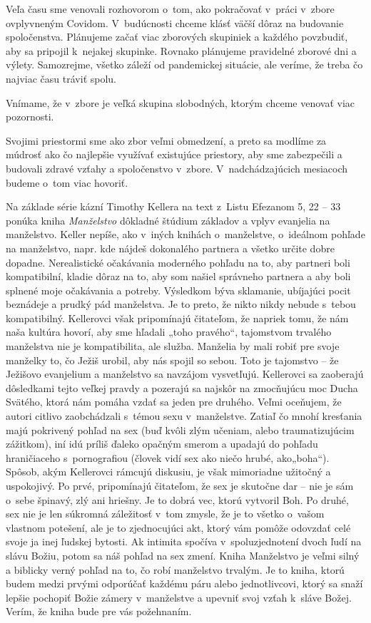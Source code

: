 Veľa času sme venovali rozhovorom o~tom, ako pokračovať v~práci v~zbore ovplyvneným Covidom. V~budúcnosti chceme klásť väčší dôraz na budovanie spoločenstva. Plánujeme začať viac zborových skupiniek a každého povzbudiť, aby sa pripojil k~nejakej skupinke. Rovnako plánujeme pravidelné zborové dni a výlety. Samozrejme, všetko záleží od pandemickej situácie, ale veríme, že treba čo najviac času tráviť spolu.

Vnímame, že v~zbore je veľká skupina slobodných, ktorým chceme venovať viac pozornosti.

Svojimi priestormi sme ako zbor veľmi obmedzení, a preto sa modlíme za múdrosť ako čo najlepšie využívať existujúce priestory, aby sme zabezpečili a budovali zdravé vzťahy a spoločenstvo v~zbore. V~nadchádzajúcich mesiacoch budeme o~tom viac hovoriť.



Na základe série kázní Timothy Kellera na text z~Listu Efezanom 5, 22 -- 33 ponúka kniha {\it Manželstvo} dôkladné štúdium základov a vplyv evanjelia na manželstvo. Keller nepíše, ako v~iných knihách o~manželstve, o~ideálnom pohľade na manželstvo, napr. kde nájdeš dokonalého partnera a všetko určite dobre dopadne. Nerealistické očakávania moderného pohľadu na to, aby partneri boli kompatibilní, kladie dôraz na to, aby som našiel správneho partnera a aby boli splnené moje očakávania a potreby. Výsledkom býva sklamanie, ubíjajúci pocit beznádeje a prudký pád manželstva. Je to preto, že nikto nikdy nebude s~tebou kompatibilný. Kellerovci však pripomínajú čitateľom, že napriek tomu, že nám naša kultúra hovorí, aby sme hľadali „toho pravého“, tajomstvom trvalého manželstva nie je kompatibilita, ale služba. Manželia by mali robiť pre svoje manželky to, čo Ježiš urobil, aby nás spojil so sebou. Toto je tajomstvo -- že Ježišovo evanjelium a manželstvo sa navzájom vysvetľujú. Kellerovci sa zaoberajú dôsledkami tejto veľkej pravdy a pozerajú sa najskôr na zmocňujúcu moc Ducha Svätého, ktorá nám pomáha vzdať sa jeden pre druhého. Veľmi oceňujem, že autori citlivo zaobchádzali s~témou sexu v~manželstve. Zatiaľ čo mnohí kresťania majú pokrivený pohľad na sex (buď kvôli zlým učeniam, alebo traumatizujúcim zážitkom), iní idú príliš ďaleko opačným smerom a upadajú do pohľadu hraničiaceho s~pornografiou (človek vidí sex ako niečo hrubé, ako„boha“). Spôsob, akým Kellerovci rámcujú diskusiu, je však mimoriadne užitočný a uspokojivý. Po prvé, pripomínajú čitateľom, že sex je skutočne dar -- nie je sám o~sebe špinavý, zlý ani hriešny. Je to dobrá vec, ktorú vytvoril Boh. Po druhé, sex nie je len súkromná záležitosť v~tom zmysle, že je to všetko o~vašom vlastnom potešení, ale je to zjednocujúci akt, ktorý vám pomôže odovzdať celé svoje ja inej ľudskej bytosti. Ak intimita spočíva v~spoluzjednotení dvoch ľudí na slávu Božiu, potom sa náš pohľad na sex zmení. Kniha Manželstvo je veľmi silný a biblicky verný pohľad na to, čo robí manželstvo trvalým. Je to kniha, ktorú budem medzi prvými odporúčať každému páru alebo jednotlivcovi, ktorý sa snaží lepšie pochopiť Božie zámery v~manželstve a upevniť svoj vzťah k~sláve Božej. Verím, že kniha bude pre vás požehnaním.

